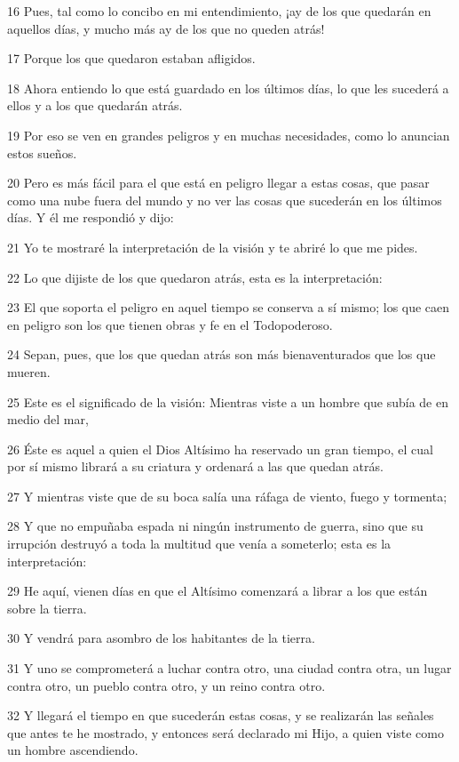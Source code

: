 \par 16 Pues, tal como lo concibo en mi entendimiento, ¡ay de los que quedarán en aquellos días, y mucho más ay de los que no queden atrás!
\par 17 Porque los que quedaron estaban afligidos.
\par 18 Ahora entiendo lo que está guardado en los últimos días, lo que les sucederá a ellos y a los que quedarán atrás.
\par 19 Por eso se ven en grandes peligros y en muchas necesidades, como lo anuncian estos sueños.
\par 20 Pero es más fácil para el que está en peligro llegar a estas cosas, que pasar como una nube fuera del mundo y no ver las cosas que sucederán en los últimos días. Y él me respondió y dijo:
\par 21 Yo te mostraré la interpretación de la visión y te abriré lo que me pides.
\par 22 Lo que dijiste de los que quedaron atrás, esta es la interpretación:
\par 23 El que soporta el peligro en aquel tiempo se conserva a sí mismo; los que caen en peligro son los que tienen obras y fe en el Todopoderoso.
\par 24 Sepan, pues, que los que quedan atrás son más bienaventurados que los que mueren.
\par 25 Este es el significado de la visión: Mientras viste a un hombre que subía de en medio del mar,
\par 26 Éste es aquel a quien el Dios Altísimo ha reservado un gran tiempo, el cual por sí mismo librará a su criatura y ordenará a las que quedan atrás.
\par 27 Y mientras viste que de su boca salía una ráfaga de viento, fuego y tormenta;
\par 28 Y que no empuñaba espada ni ningún instrumento de guerra, sino que su irrupción destruyó a toda la multitud que venía a someterlo; esta es la interpretación:
\par 29 He aquí, vienen días en que el Altísimo comenzará a librar a los que están sobre la tierra.
\par 30 Y vendrá para asombro de los habitantes de la tierra.
\par 31 Y uno se comprometerá a luchar contra otro, una ciudad contra otra, un lugar contra otro, un pueblo contra otro, y un reino contra otro.
\par 32 Y llegará el tiempo en que sucederán estas cosas, y se realizarán las señales que antes te he mostrado, y entonces será declarado mi Hijo, a quien viste como un hombre ascendiendo.
